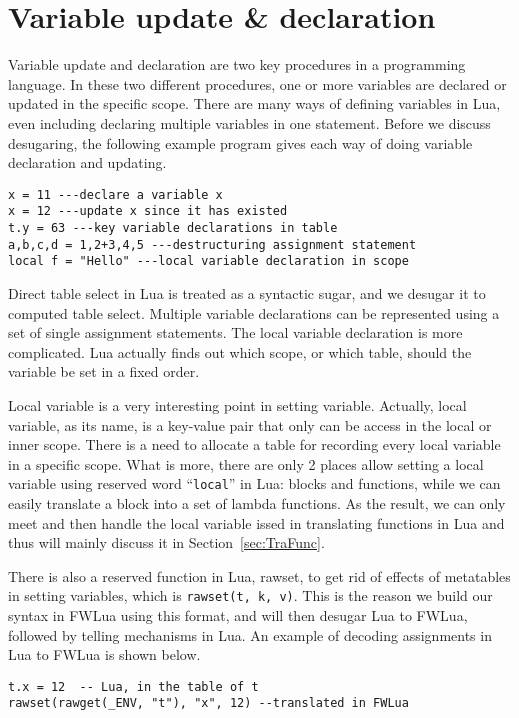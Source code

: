\section{Variable update \& declaration}\label{sec:desugarVarUpdate}
Variable update and declaration are two key procedures in a programming language. 
In these two different procedures, one or more variables are declared or updated in the specific scope. There are many ways of defining variables in Lua, even including declaring multiple variables in one statement. Before we discuss desugaring, the following example program gives each way of doing variable declaration and updating.

\begin{verbatim}
x = 11 ---declare a variable x
x = 12 ---update x since it has existed
t.y = 63 ---key variable declarations in table
a,b,c,d = 1,2+3,4,5 ---destructuring assignment statement
local f = "Hello" ---local variable declaration in scope
\end{verbatim}

Direct table select in Lua is treated as a syntactic sugar, and we desugar it to computed table select. 
Multiple variable declarations can be represented using a set of single assignment statements. 
The local variable declaration is more complicated. Lua actually finds out which scope, or which table, should the variable be set in a fixed order. 

Local variable is a very interesting point in setting variable. Actually, local variable, as its name, is a key-value pair that only can be access in the local or inner scope. There is a need to allocate a table for recording every local variable in a specific scope. What is more, there are only 2 places allow setting a local variable using reserved word ``{\tt local}'' in Lua: blocks and functions,  while we can easily translate a block into a set of lambda functions. As the result, we can only meet and then handle the local variable issed in translating functions in Lua and thus will mainly discuss it in Section~\ref{sec:TraFunc}. 

There is also a reserved function in Lua, rawset, to get rid of effects of metatables in setting variables, which is {\tt rawset(t, k, v)}. This is the reason we build our syntax in FWLua using this format, and will then desugar Lua to FWLua, followed by telling mechanisms in Lua.
An example of decoding assignments in Lua to FWLua is shown below.

\begin{verbatim}
t.x = 12  -- Lua, in the table of t
rawset(rawget(_ENV, "t"), "x", 12) --translated in FWLua
\end{verbatim}

